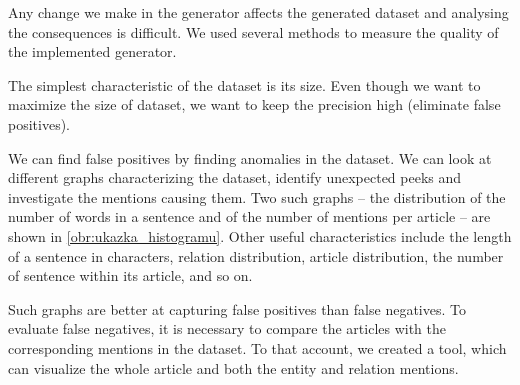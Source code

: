 Any change we make in the generator affects the generated dataset and analysing the consequences is difficult. We used several methods to measure the quality of the implemented generator.

The simplest characteristic of the dataset is its size. Even though we want to maximize the size of dataset, we want to keep the precision high (eliminate false positives).

We can find false positives by finding anomalies in the dataset. We can look at different graphs characterizing the dataset, identify unexpected peeks and investigate the mentions causing them. Two such graphs -- the distribution of the number of words in a sentence and of the number of mentions per article -- are shown in  \autoref{obr:ukazka_histogramu}. Other useful characteristics include the length of a sentence in characters, relation distribution, article distribution, the number of sentence within its article, and so on.

Such graphs are better at capturing false positives than false negatives. To evaluate false negatives, it is necessary to compare the articles with the corresponding mentions in the dataset. To that account, we created a tool, which can visualize the whole article and both the entity and relation mentions.

